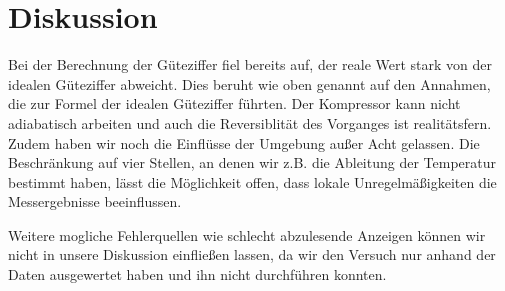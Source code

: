 \section{Diskussion}
\label{sec:Diskussion}

Bei der Berechnung der Güteziffer fiel bereits auf, der reale Wert stark von der idealen Güteziffer abweicht.
Dies beruht wie oben genannt auf den Annahmen, die zur Formel der idealen Güteziffer führten.
Der Kompressor kann nicht adiabatisch arbeiten und auch die Reversiblität des Vorganges ist realitätsfern.
Zudem haben wir noch die Einflüsse der Umgebung außer Acht gelassen.
Die Beschränkung auf vier Stellen, an denen wir z.B. die Ableitung der Temperatur bestimmt haben, lässt die Möglichkeit offen, dass lokale Unregelmäßigkeiten die Messergebnisse beeinflussen.

Weitere mogliche Fehlerquellen wie schlecht abzulesende Anzeigen können wir nicht in unsere Diskussion einfließen lassen, da wir den Versuch nur anhand der Daten ausgewertet haben und ihn nicht durchführen konnten.
